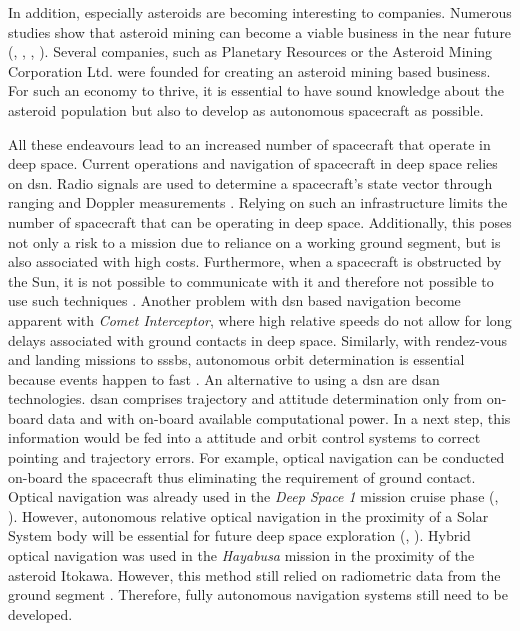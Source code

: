In addition, especially asteroids are becoming interesting to companies. Numerous studies show that asteroid mining can become a viable business in the near future (\cite{andrews2015defining}, \cite{busch2004profitable}, \cite{weinzierl2018EconomicFrontier}, \cite{pittman2017deep}). Several companies, such as Planetary Resources \cite{lewicki2013planetary} or the Asteroid Mining Corporation Ltd. \cite{asteroidminingcorporation} were founded for creating an asteroid mining based business. For such an economy to thrive, it is essential to have sound knowledge about the asteroid population but also to develop as autonomous spacecraft as possible.

All these endeavours lead to an increased number of spacecraft that operate in deep space. Current operations and navigation of spacecraft in deep space relies on \gls{dsn}. Radio signals are used to determine a spacecraft's state vector through ranging and Doppler measurements \cite{ramamurthy2015delta}. Relying on such an infrastructure limits the number of spacecraft that can be operating in deep space. Additionally, this poses not only a risk to a mission due to reliance on a working ground segment, but is also associated with high costs. Furthermore, when a spacecraft is obstructed by the Sun, it is not possible to communicate with it and therefore not possible to use such techniques \cite{kominato2006optical}. Another problem with \gls{dsn} based navigation become apparent with \textit{Comet Interceptor}, where high relative speeds do not allow for long delays associated with ground contacts in deep space. Similarly, with rendez-vous and landing missions to \gls{sssb}s, autonomous orbit determination is essential because events happen to fast \cite{shuang2013imageprocessing}. An alternative to using a \gls{dsn} are \gls{dsan} technologies. \gls{dsan} comprises trajectory and attitude determination only from on-board data and with on-board available computational power. In a next step, this information would be fed into a attitude and orbit control systems to correct pointing and trajectory errors. For example, optical navigation can be conducted on-board the spacecraft thus eliminating the requirement of ground contact. Optical navigation was already used in the \textit{Deep Space 1} mission cruise phase (\cite{Riedel2000AutonomousReport}, \cite{bhaskaran2012autonomous}). However, autonomous relative optical navigation in the proximity of a Solar System body will be essential for future deep space exploration (\cite{steffes2017deep}, \cite{martin2006jpl}). Hybrid optical navigation was used in the \textit{Hayabusa} mission in the proximity of the asteroid Itokawa. However, this method still relied on radiometric data from the ground segment \cite{kominato2006optical}. Therefore, fully autonomous navigation systems still need to be developed.

